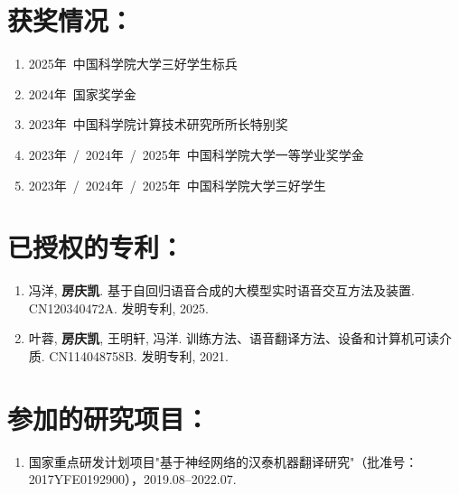 \section*{获奖情况：}

{
\setlist[enumerate]{}%
\begin{enumerate}[nosep]
    \item 2025年~中国科学院大学三好学生标兵
    \item 2024年~国家奖学金
    \item 2023年~中国科学院计算技术研究所所长特别奖
    \item 2023年~/~2024年~/~2025年~中国科学院大学一等学业奖学金
    \item 2023年~/~2024年~/~2025年~中国科学院大学三好学生
\end{enumerate}
}

\section*{已授权的专利：}

{
\setlist[enumerate]{}%
\begin{enumerate}[nosep]
    \item 冯洋, \textbf{房庆凯}. 基于自回归语音合成的大模型实时语音交互方法及装置. CN120340472A. 发明专利, 2025.
    \item 叶蓉, \textbf{房庆凯}, 王明轩, 冯洋. 训练方法、语音翻译方法、设备和计算机可读介质. CN114048758B. 发明专利, 2021.
\end{enumerate}
}

\section*{参加的研究项目：}

{
\setlist[enumerate]{}%
\begin{enumerate}[nosep]
    \item 国家重点研发计划项目"基于神经网络的汉泰机器翻译研究"（批准号：2017YFE0192900），2019.08--2022.07.
\end{enumerate}
}


\cleardoublepage[plain]%
